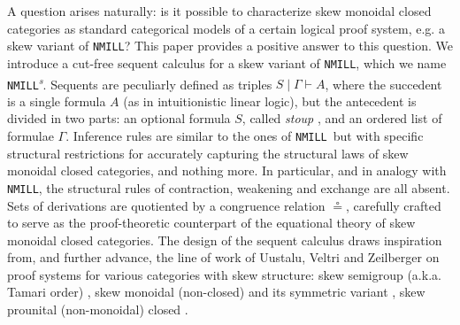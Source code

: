 \documentclass[submission,copyright,creativecommons]{eptcs}
\theoremstyle{definition}
\newcommand{\NMILL}{\texttt{NMILL}}
\newcommand{\SkNMILL}{\NMILL\textsuperscript{\textit{s}}}
\begin{document}
A question arises naturally: is it possible to characterize skew monoidal closed categories as standard categorical models of a certain logical proof system, e.g. a skew variant of \NMILL?
This paper provides a positive answer to this question. We introduce a cut-free sequent calculus for a skew variant of \NMILL, which we name \SkNMILL. Sequents are peculiarly defined as triples $S \mid \Gamma \vdash A$, where the succedent is a single formula $A$ (as in intuitionistic linear logic), but the antecedent is divided in two parts: an optional formula $S$, called \emph{stoup} \cite{girard:constructive:91}, and an ordered list of formulae $\Gamma$. Inference rules are similar to the ones of \NMILL\ but with specific structural restrictions for accurately capturing the structural laws of skew monoidal closed categories, and nothing more. In particular, and in analogy with \NMILL, the structural rules of contraction, weakening and exchange are all absent. Sets of derivations are quotiented by a congruence relation $\circeq$, carefully crafted to serve as the proof-theoretic counterpart of the equational theory of skew monoidal closed categories. The design of the sequent calculus draws inspiration from, and further advance, the line of work of Uustalu, Veltri and Zeilberger on proof systems for various categories with skew structure: skew semigroup (a.k.a. Tamari order) \cite{zeilberger:semiassociative:19}, skew monoidal (non-closed) \cite{uustalu:sequent:2021,uustalu:proof:nodate} and its symmetric variant \cite{veltri:coherence:2021}, skew prounital (non-monoidal) closed \cite{uustalu:deductive:nodate}.
\end{document}
